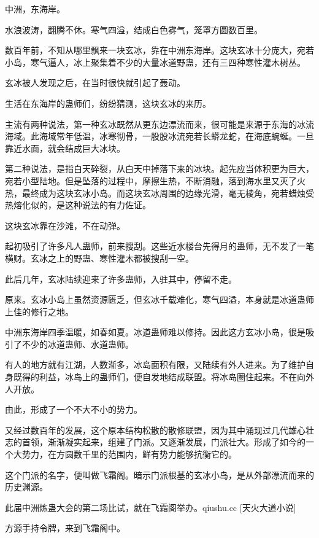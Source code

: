 
\begin{this_body}

中洲，东海岸。

水浪波涛，翻腾不休。寒气四溢，结成白色雾气，笼罩方圆数百里。

数百年前，不知从哪里飘来一块玄冰，靠在中洲东海岸。这块玄冰十分庞大，宛若小岛，寒气逼人，冰上聚集着不少的大量冰道野蛊，还有三四种寒性灌木树丛。

玄冰被人发现之后，在当时很快就引起了轰动。

生活在东海岸的蛊师们，纷纷猜测，这块玄冰的来历。

主流有两种说法，第一种玄冰既然从更东边漂流而来，很可能是来源于东海的冰流海域。此海域常年低温，冰寒彻骨，一股股冰流宛若长蟒龙蛇，在海底蜿蜒。一旦靠近水面，就会结成巨大冰块。

第二种说法，是指白天碎裂，从白天中掉落下来的冰块。起先应当体积更为巨大，宛若小型陆地。但是坠落的过程中，摩擦生热，不断消融，落到海水里又灭了火热，最终成为这块玄冰小岛。而这块玄冰周围的边缘光滑，毫无棱角，宛若蜡烛受热熔化似的，是这种说法的有力佐证。

这块玄冰靠在沙滩，不在动弹。

起初吸引了许多凡人蛊师，前来搜刮。这些近水楼台先得月的蛊师，无不发了一笔横财。玄冰之上的野蛊、寒性灌木都被搜刮一空。

此后几年，玄冰陆续迎来了许多蛊师，入驻其中，停留不走。

原来。玄冰小岛上虽然资源匮乏，但玄冰千载难化，寒气四溢，本身就是冰道蛊师上佳的修行之地。

中洲东海岸四季温暖，如春如夏。冰道蛊师难以修持。因此这方玄冰小岛，很是吸引了不少的冰道蛊师、水道蛊师。

有人的地方就有江湖，人数渐多，冰岛面积有限，又陆续有外人进来。为了维护自身既得的利益，冰岛上的蛊师们，便自发地结成联盟。将冰岛圈住起来。不在向外人开放。

由此，形成了一个不大不小的势力。

又经过数百年的发展，这个原本结构松散的散修联盟，因为其中涌现过几代雄心壮志的首领，渐渐凝实起来，组建了门派。又逐渐发展，门派壮大。形成了如今的一个大势力，在方圆数千里的范围内，鲜有势力能够抗衡它的。

这个门派的名字，便叫做飞霜阁。暗示门派根基的玄冰小岛，是从外部漂流而来的历史渊源。

此届中洲炼蛊大会的第二场比试，就在飞霜阁举办。qiushu.cc [天火大道小说]

方源手持令牌，来到飞霜阁中。


\end{this_body}
